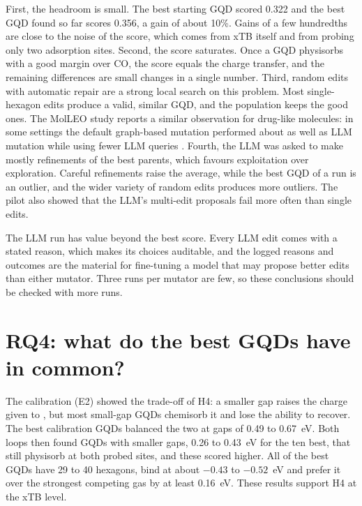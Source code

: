 First, the headroom is small. The best starting GQD scored 0.322 and the best GQD found so far
scores 0.356, a gain of about 10\%. Gains of a few hundredths are close to the noise of the score,
which comes from xTB itself and from probing only two adsorption sites. Second, the score
saturates. Once a GQD physisorbs  with a good margin over CO, the score equals the charge
transfer, and the remaining differences are small changes in a single number. Third, random edits
with automatic repair are a strong local search on this problem. Most single-hexagon edits produce
a valid, similar GQD, and the population keeps the good ones. The MolLEO study reports a similar
observation for drug-like molecules: in some settings the default graph-based mutation performed
about as well as LLM mutation while using fewer LLM queries \cite{wang2024molleo}.
 Fourth, the LLM was asked to make
mostly refinements of the best parents, which favours exploitation over exploration. Careful
refinements raise the average, while the best GQD of a run is an outlier, and the wider variety of
random edits produces more outliers. The pilot also showed that the LLM's multi-edit proposals fail
more often than single edits.

The LLM run has value beyond the best score. Every LLM edit comes with a stated reason, which makes
its choices auditable, and the logged reasons and outcomes are the material for fine-tuning a model
that may propose better edits than either mutator. Three runs per mutator are few, so these conclusions should be
checked with more runs. 

\section{RQ4: what do the best GQDs have in common?}

The calibration (E2) showed the trade-off of H4: a smaller gap raises the charge given to ,
but most small-gap GQDs chemisorb it and lose the ability to recover. The best calibration GQDs
balanced the two at gaps of 0.49 to 0.67~eV. Both loops then found GQDs with smaller gaps, 0.26 to
0.43~eV for the ten best, that still physisorb  at both probed sites, and these scored
higher. All of the best GQDs have 29 to 40 hexagons, bind  at about \(-0.43\) to
\(-0.52\)~eV and prefer it over the strongest competing gas by at least 0.16~eV. These results support H4 at the xTB level.

